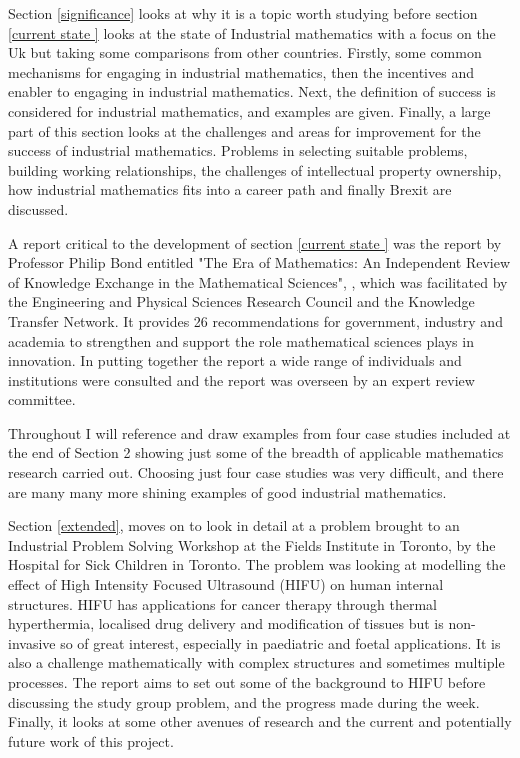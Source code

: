 \documentclass[11pt]{article} %
\begin{document}
	Section \ref{significance} looks at why it is  a topic worth studying before section \ref{current state } looks at the state of Industrial mathematics with a focus on the Uk but taking some comparisons from other countries.  Firstly, some common mechanisms for engaging in industrial mathematics, then the incentives and enabler to engaging in industrial mathematics. Next, the definition of success is considered for industrial mathematics, and examples are given. Finally, a large part of this section looks at the challenges and areas for improvement for the success of industrial mathematics. Problems in selecting suitable problems, building working relationships, the challenges of intellectual property ownership, how industrial mathematics fits into a career path and finally Brexit are discussed.
	
	
	 A report critical to the development of  section \ref{current state } was the report by Professor Philip Bond entitled "The Era of Mathematics: An Independent Review of Knowledge Exchange in the Mathematical Sciences", \cite{Bond}, which was facilitated by the Engineering and Physical Sciences Research Council and the Knowledge Transfer Network. It provides 26 recommendations for government, industry and academia to strengthen and support the role mathematical sciences plays in innovation. In putting together the report a wide range of individuals and institutions were consulted and the report was overseen by an expert review committee. 
	
	Throughout I will reference and draw examples from four case studies included at the end of Section 2  showing just some of the breadth of applicable mathematics research carried out. Choosing just four case studies was very difficult, and there are many many more shining examples of good industrial mathematics. 
	
	Section \ref{extended}, moves on to look in detail at a problem brought to an Industrial Problem Solving Workshop at the Fields Institute in Toronto, by the Hospital for Sick Children in Toronto. The problem was looking at modelling the effect of High Intensity Focused Ultrasound (HIFU) on human internal structures. HIFU has applications for cancer therapy through thermal hyperthermia, localised drug delivery and modification of tissues but is non-invasive so of great interest, especially in paediatric and foetal applications. It is also a challenge mathematically with complex structures and sometimes multiple processes. The report aims to set out some of the background to HIFU before discussing the study group problem, and the progress made during the week. Finally, it looks at some other avenues of research and the current and potentially future work of this project. 
	
\end{document}
